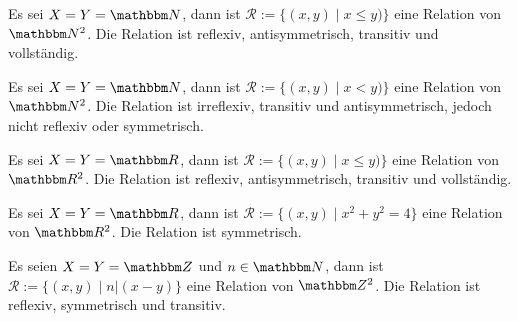 \begin{Unit}[Beispiel] 
  Es sei $X = Y = \NN$, dann ist $\mathcal{R} := \{ (x,y) \mid x \leq y) \}$ 
  eine Relation von $\NN^2$. Die Relation ist reflexiv, antisymmetrisch, 
  transitiv und vollständig.
\end{Unit}

\begin{Unit}[Beispiel] 
  Es sei $X = Y = \NN$, dann ist $\mathcal{R} := \{ (x,y) \mid x < y) \}$ 
  eine   Relation von $\NN^2$. Die Relation ist irreflexiv, transitiv und 
  antisymmetrisch, jedoch nicht reflexiv oder symmetrisch.
\end{Unit}

\begin{Unit}[Beispiel] 
  Es sei $X = Y = \RR$, dann ist $\mathcal{R} := \{ (x,y) \mid x \leq y) \}$ 
  eine Relation von $\RR^2$. Die Relation ist reflexiv, antisymmetrisch, 
  transitiv und vollständig.
\end{Unit}

\begin{Unit}[Beispiel] 
  Es sei $X = Y = \RR$, dann ist $\mathcal{R} := \{ (x,y) \mid x^2 + y^2 = 4 \}$ 
  eine Relation von $\RR^2$. Die Relation ist symmetrisch.
\end{Unit}

\begin{Unit}[Beispiel] 
  Es seien $X = Y = \ZZ$ und $n \in \NN$, dann ist $\mathcal{R} := \{ (x,y) \mid 
    n|(x - y) \}$ eine Relation von $\ZZ^2$. Die Relation ist reflexiv, 
    symmetrisch und transitiv.
\end{Unit}


